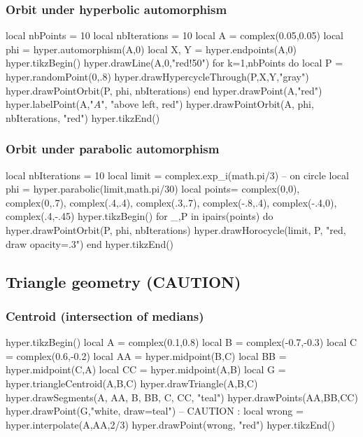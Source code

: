 \documentclass{article}
\begin{document}
\subsubsection{Orbit under hyperbolic automorphism}
\begin{codeandresult}
\begin{luacode*}
local nbPoints = 10
local nbIterations = 10
local A = complex(0.05,0.05)
local phi = hyper.automorphism(A,0)
local X, Y = hyper.endpoints(A,0)
hyper.tikzBegin()
hyper.drawLine(A,0,"red!50")
for k=1,nbPoints do
	local P = hyper.randomPoint(0,.8)
	hyper.drawHypercycleThrough(P,X,Y,"gray")
	hyper.drawPointOrbit(P, phi, nbIterations) 
end
hyper.drawPoint(A,"red")
hyper.labelPoint(A,"$A$", "above left, red")
hyper.drawPointOrbit(A, phi, nbIterations, "red") 
hyper.tikzEnd()
\end{luacode*}
\end{codeandresult}


\subsubsection{Orbit under parabolic automorphism}
\begin{codeandresult}
\begin{luacode*}
local nbIterations = 10
local limit = complex.exp_i(math.pi/3) -- on circle
local phi = hyper.parabolic(limit,math.pi/30)
local points={
	complex(0,0), complex(0,.7),
	complex(.4,.4), complex(.3,.7),
	complex(-.8,.4), complex(-.4,0),
	complex(.4,-.45)}
hyper.tikzBegin()
for _,P in ipairs(points) do
	hyper.drawPointOrbit(P, phi, nbIterations) 
	hyper.drawHorocycle(limit, P, "red, draw opacity=.3")
end
hyper.tikzEnd()
\end{luacode*}
\end{codeandresult}


\subsection{Triangle geometry (CAUTION)}

\subsubsection{Centroid (intersection of medians)}
\begin{codeandresult}
\begin{luacode*}
hyper.tikzBegin()
local A = complex(0.1,0.8)
local B = complex(-0.7,-0.3)
local C = complex(0.6,-0.2)
local AA = hyper.midpoint(B,C)
local BB = hyper.midpoint(C,A)
local CC = hyper.midpoint(A,B)
local G = hyper.triangleCentroid(A,B,C) 
hyper.drawTriangle(A,B,C)
hyper.drawSegments(A, AA, B, BB, C, CC, "teal")
hyper.drawPoints(AA,BB,CC)
hyper.drawPoint(G,"white, draw=teal")
-- CAUTION : 
local wrong = hyper.interpolate(A,AA,2/3)
hyper.drawPoint(wrong, "red")
hyper.tikzEnd()
\end{luacode*}
\end{codeandresult}
\end{document}
